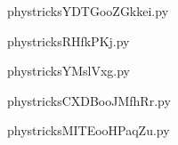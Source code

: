     

    \clearpage
    


    \newcommand{\CaptionFigYDTGooZGkkei}{<+Type your caption here+>}
    \begin{center}
        
    \end{center}
    phystricksYDTGooZGkkei.py

    

    \clearpage
    


    \newcommand{\CaptionFigRHfkPKj}{<+Type your caption here+>}
    \begin{center}
        
    \end{center}
    phystricksRHfkPKj.py

    

    \clearpage
    


    \newcommand{\CaptionFigYMslVxg}{<+Type your caption here+>}
    \begin{center}
        
    \end{center}
    phystricksYMslVxg.py

    

    \clearpage
    


    \newcommand{\CaptionFigCXDBooJMfhRr}{<+Type your caption here+>}
    \begin{center}
        
    \end{center}
    phystricksCXDBooJMfhRr.py

    

    \clearpage
    


    \newcommand{\CaptionFigMITEooHPaqZu}{<+Type your caption here+>}
    \begin{center}
        
    \end{center}
    phystricksMITEooHPaqZu.py

    

    \clearpage
    


